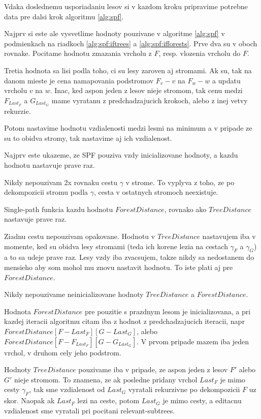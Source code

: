 Vdaka doslednemu usporiadaniu lesov si v kazdom kroku pripravime potrebne
data pre dalsi krok algoritmu \ref{alg:spf}.

Najprv si este ale vysvetlime hodnoty pouzivane v algoritme \ref{alg:spf} v podmienkach
na riadkoch \ref{alg:spf:iftrees} a \ref{alg:spf:ifforests}. Prve dva su v oboch rovnake.
Pocitame hodnotu zmazania vrcholu z $F$, resp. vlozenia vrcholu do $F$.

Tretia hodnota sa lisi podla toho, ci su lesy zaroven aj stromami. Ak su, tak na danom mieste
je cena namapovania podstromov $F_{v} - v$ na $F_{w} - w$ a updatu vrcholu $v$ na $w$.
Inac, ked aspon jeden z lesov nieje stromom, tak cenu medzi $F_{Last_{F}}$ a $G_{Last_{G}}$
mame vyratanu z predchadzajucich krokoch, alebo z inej vetvy rekurzie.

Potom nastavime hodnotu vzdialenosti medzi lesmi na minimum a v pripade ze su to obidva stromy,
tak nastavime aj ich vzdialenost.

Najprv este ukazeme, ze SPF pouziva vzdy inicializovane hodnoty, a kazdu hodnotu nastavuje prave raz.

\begin{pozn}
  Nikdy nepouzivam 2x rovnaku cestu $\gamma$ v strome. To vyplyva z toho, ze po dekompozicii
  stromu podla $\gamma$, cesta v ostatnych stromoch neexistuje.
\end{pozn}

\begin{pozn}
  Single-path funkcia kazdu hodnotu $ForestDistance$, rovnako ako $TreeDistance$ nastavuje
  prave raz.
\end{pozn}

\begin{dukaz}
  Ziadnu cestu nepouzivam opakovane. Hodnotu v $TreeDistance$ nastavujem iba v momente,
  ked su obidva lesy stromami (teda ich korene lezia na cestach $\gamma_{F}$ a $\gamma_{G}$)
  a to sa udeje prave raz.
  Lesy vzdy iba zvacsujem, takze nikdy sa nedostanem do mensieho aby som mohol mu znovu nastavit
  hodnotu. To iste plati aj pre $ForestDistance$.
\end{dukaz}

\begin{lemma}
  Nikdy nepouzivame neinicializovane hodnoty $TreeDistance$ a $ForestDistance$.
\end{lemma}

\begin{dukaz}
  Hodnota $ForestDistance$ pre pouzitie s prazdnym lesom je inicializovana, a pri kazdej iteracii
  algoritmu citam iba z hodnot z predchadzajucich iteracii, napr
  $ForestDistance[F - Last_{F}][G - Last_{G}]$, alebo $ForestDistance[F - F_{Last_{F}}][G - G_{Last_{G}}]$.
  V prvom pripade mazem iba jeden vrchol, v druhom cely jeho podstrom.

  Hodnoty $TreeDistance$ pouzivame iba v pripade, ze aspon jeden z lesov $F'$ alebo $G'$ nieje stromom.
  To znamena, ze ak posledne pridany vrchol $Last_{F}$ je mimo cesty $\gamma_{F}$, tak sme vzdialenost
  od $Last_{G}$ vyratali rekurzivne po dekompozicii $F$ uz skor.
  Naopak ak $Last_{F}$ lezi na ceste, potom $Last_{G}$ je mimo cesty, a editacnu vzdialenost
  sme vyratali pri pocitani relevant-subtrees.
\end{dukaz}

